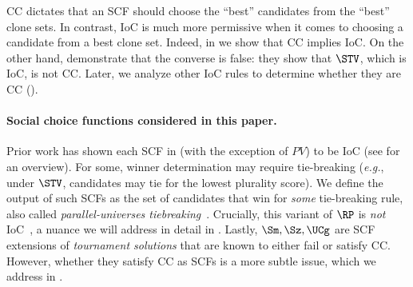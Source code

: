 CC dictates that an SCF should choose the ``best'' candidates from the ``best'' clone sets. In contrast, IoC is much more permissive when it comes to choosing a candidate from a best clone set. Indeed, in  we show that CC implies IoC. On the other hand,  demonstrate that the converse is false: they show that $\STV$, which is IoC, is not CC. Later, we analyze other IoC rules to determine whether they are CC ().  

\paragraph{Social choice functions considered in this paper.}\label{subsec:rules}
Prior work has shown each SCF in  (with the exception of $\mathit{PV}$) to be IoC (see \citet{Holliday23:Split} for an overview). For some, winner determination may require tie-breaking (\emph{e.g.}, under $\STV$, candidates may tie for the lowest plurality score). We define the output of such SCFs as the set of candidates that win for \textit{some} tie-breaking rule, also called \emph{parallel-universes tiebreaking}~\citep{Conitzer09:Preference}. Crucially, this variant of $\RP$ is \textit{not} IoC~\citep{Zavist89:Complete}, a nuance we will address in detail in . Lastly, $\Sm, \Sz, \UCg$ are SCF extensions of \emph{tournament solutions} that are known to either fail or satisfy CC. However, whether they satisfy CC as SCFs is a more subtle issue, which we address in .

